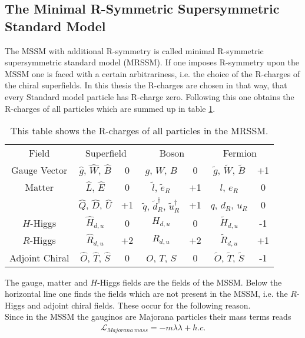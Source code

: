 \subsection{The Minimal R-Symmetric Supersymmetric Standard Model}
The MSSM with additional R-symmetry is called minimal R-symmetric supersymmetric standard model (MRSSM).
If one imposes R-symmetry upon the MSSM one is faced with a certain arbitrariness, i.e. the choice of the R-charges of the chiral superfields. In this thesis the R-charges are chosen in that way, that every Standard model particle has R-charge zero. Following this one obtains the R-charges of all particles which are summed up in table \ref{tab:R_charges_MRSSM}. 
\begin{table}
\begin{center}
\begin{tabular}{c||c|c||c|c||c|c}
Field & \multicolumn{2}{c||}{Superfield} & \multicolumn{2}{c||}{Boson} & \multicolumn{2}{c}{Fermion} \\
\hhline{=#=|=#=|=#=|=}
Gauge Vector & $\hat{g}$, $\hat{W}$, $\hat{B}$ & 0 & $g$, $W$, $B$ & 0 & $\tilde{g}$, $\tilde{W}$, $\tilde{B}$ &+1\\
Matter & $\hat{L}$, $\hat{E}$ & 0 & $\tilde{l}$, $\tilde{e}_R$ & +1 & $l$, $e_R$ & 0\\
 & $\hat{Q}$, $\hat{D}$, $\hat{U}$ & +1 & $\tilde{q}$, $\tilde{d}^\dagger_R$, $\tilde{u}^\dagger_R$ & +1 & $q$, $d_R$, $u_R$ & 0\\
$H$-Higgs & $\hat{H}_{d,u}$ & 0 & $H_{d,u}$ & 0 & $\tilde{H}_{d,u}$ & -1\\
\hline
$R$-Higgs & $\hat{R}_{d,u}$ & +2 & $R_{d,u}$ & +2 & $\tilde{R}_{d,u}$ & +1\\
Adjoint Chiral & $\hat{O}$, $\hat{T}$, $\hat{S}$ & 0 & $O$, $T$, $S$ & 0 & $\tilde{O}$, $\tilde{T}$, $\tilde{S}$ & -1
\end{tabular}
\caption{This table shows the R-charges of all particles in the MRSSM.}\label{tab:R_charges_MRSSM}
\end{center}
\end{table}
The gauge, matter and $H$-Higgs fields are the fields of the MSSM. Below the horizontal line one finds the fields which are not present in the MSSM, i.e. the $R$-Higgs and adjoint chiral fields. These occur for the following reason.\\
Since in the MSSM the gauginos are Majorana particles their mass terms reads 
\begin{align}
\mathcal{L}_{Majorana\ mass} = -m\lambda\lambda + h.c.
\end{align}
